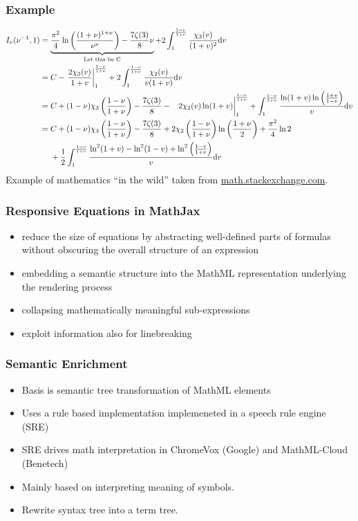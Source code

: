 \documentclass{beamer}
\begin{document}
\begin{frame}
  \frametitle{Example}\scriptsize
  \begin{align*}
I_\nu(\nu^{-1},1)
&=\underbrace{\frac{\pi^2}{4}\ln\left(\frac{(1+\nu)^{1+\nu}}{\nu^\nu}
\right)-\frac{7\zeta(3)}{8}\nu}_{\text{Let this be 
C}}+2\int^\frac{1-\nu}{1+\nu}_1\frac{\chi_3(v)}{(1+v)^2}{\rm d}v\\
&=C-\left.\frac{2\chi_3(v)}{1+v}\right|^\frac{1-\nu}{1+\nu}_1+2\int^\frac{1-\nu}
{1+\nu}_1\frac{\chi_2(v)}{v(1+v)}{\rm d}v\\
&=C+(1-\nu)\chi_3\left(\frac{1-\nu}{1+\nu}\right)-\frac{7\zeta(3)}{8}
-\left.{\color{white}{\frac{1}{1}}}2\chi_2(v)\ln(1+v)\right|^\frac{1-\nu}{1+\nu}
_1+\int^\frac{1-\nu}{1+\nu}_1\frac{\ln(1+v)\ln\left(\frac{1+v}{1-v}\right)}{v}{
\rm d}v\\
&=C+(1-\nu)\chi_3\left(\frac{1-\nu}{1+\nu}\right)-\frac{7\zeta(3)}{8}
+2\chi_2\left(\frac{1-\nu}{1+\nu}\right)\ln\left(\frac{1+\nu}{2}\right)+\frac{
\pi^2}{4}\ln{2}\\
&\ \ \ \ 
+\frac{1}{2}\int^\frac{1-\nu}{1+\nu}_1\frac{
\ln^2(1+v)-\ln^2(1-v)+\ln^2\left(\frac{1-v}{1+v}\right)}{v}{\rm d}v
\end{align*}
\normalsize Example of mathematics ``in the wild'' taken from
\href{http://math.stackexchange.com/a/1285149}{math.stackexchange.com}.
\end{frame}

\begin{frame}
  \frametitle{Responsive Equations in MathJax}
  \begin{itemize}
  \item reduce the size of equations by abstracting well-defined parts of
    formulas without obscuring the overall structure of an expression
  \item embedding a semantic structure into the MathML representation underlying
    the rendering process
  \item collapsing mathematically meaningful sub-expressions
  \item exploit information also for linebreaking
  \end{itemize}
\end{frame}

\begin{frame}
  \frametitle{Semantic Enrichment}
  \begin{itemize}
  \item Basis is semantic tree transformation of MathML elements
  \item Uses a rule based implementation implemeneted in a speech rule engine (SRE)
  \item SRE drives math interpretation in ChromeVox (Google) and MathML-Cloud
    (Benetech)
  \item Mainly based on interpreting meaning of symbols.
  \item Rewrite syntax tree into a term tree.
  \end{itemize}
\end{frame}
\end{document}
